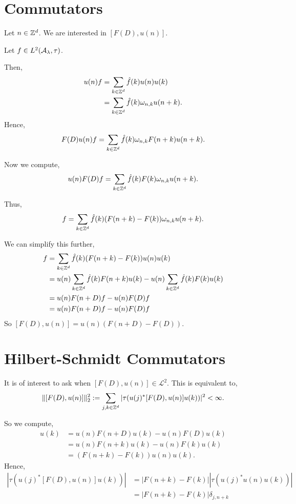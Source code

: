 \section{Commutators}
Let $n \in \mathbb{Z}^d$. We are interested in $[F(D),u(n)]$. 

Let $f \in L^2(\mathcal{A}_\lambda,\tau)$. 

Then,
\begin{align}
    u(n)f &= \sum_{k \in \mathbb{Z}^d} \hat{f}(k)u(n)u(k)\\
          &= \sum_{k \in \mathbb{Z}^d} \hat{f}(k)\omega_{n,k} u(n+k).
\end{align}
Hence,
\begin{equation}
    F(D) u(n)f = \sum_{k \in \mathbb{Z}^d} \hat{f}(k) \omega_{n,k} F(n+k) u(n+k).
\end{equation}

Now we compute,
\begin{equation}
    u(n)F(D)f = \sum_{k \in \mathbb{Z}^d} \hat{f}(k) F(k) \omega_{n,k} u(n+k).
\end{equation}

Thus,
\begin{equation}
    [F(D),u(n)]f = \sum_{k \in \Itgr^d} \hat{f}(k) (F(n+k)-F(k))\omega_{n,k}u(n+k).
\end{equation}

We can simplify this further,
\begin{align}
    [F(D),u(n)]f &= \sum_{k \in \Itgr^d} \hat{f}(k) (F(n+k)-F(k))u(n)u(k)\\
                 &= u(n)\sum_{k \in \Itgr^d}  \hat{f}(k) F(n+k)u(k) - u(n) \sum_{k \in \Itgr^d} \hat{f}(k)F(k)u(k)\\
                 &= u(n) F(n+D)f - u(n)F(D)f\\
                 \label{commutatorFormula}
                 &= u(n)F(n+D)f - u(n)F(D)f
\end{align}
So $[F(D),u(n)] = u(n)(F(n+D)-F(D))$. 

\section{Hilbert-Schmidt Commutators}
It is of interest to ask when $[F(D),u(n)] \in \mathcal{L}^2$. This is equivalent to,
\begin{equation}
    \|[F(D),u(n)]\|_{2}^2 := \sum_{j,k \in \mathbb{Z}^d} |\tau(u(j)^* [F(D),u(n)]u(k))|^2 < \infty.
\end{equation}

So we compute,
\begin{align}
    [F(D),u(n)]u(k) &= u(n)F(n+D)u(k) - u(n)F(D)u(k)\\
                    &= u(n)F(n+k)u(k) - u(n)F(k)u(k)\\
                    &= (F(n+k)-F(k))u(n)u(k).
\end{align}
Hence,
\begin{align}
    |\tau(u(j)^*[F(D),u(n)]u(k))| &= |F(n+k)-F(k)||\tau(u(j)^*u(n)u(k))|\\
                                  &= |F(n+k)-F(k)|\delta_{j,n+k}\\
\end{align}

